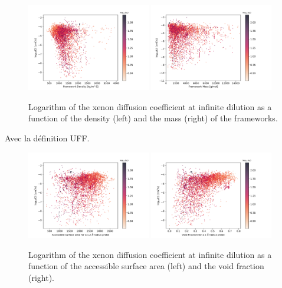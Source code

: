 \documentclass[main]{subfiles}
\begin{document}

\begin{figure}[ht]
  \centering
    \includegraphics[width=0.48\textwidth]{figures/5-diffusion/D_log-density_s_+.pdf}
    \includegraphics[width=0.48\textwidth]{figures/5-diffusion/D_log-mass_s_+.pdf}
    \caption{Logarithm of the xenon diffusion coefficient at infinite dilution as a function of the density (left) and the mass (right) of the frameworks. }\label{fgr:diff_density_mass}
\end{figure}

Avec la définition UFF.


\begin{figure}[ht]
  \centering
    \includegraphics[width=0.48\textwidth]{figures/5-diffusion/D_log-sa_12_s_+.pdf}
    \includegraphics[width=0.48\textwidth]{figures/5-diffusion/D_log-vf_2_s_+.pdf}
    \caption{Logarithm of the xenon diffusion coefficient at infinite dilution as a function of the accessible surface area (left) and the void fraction (right). }\label{fgr:diff_sa_vf}
\end{figure}
\end{document}
